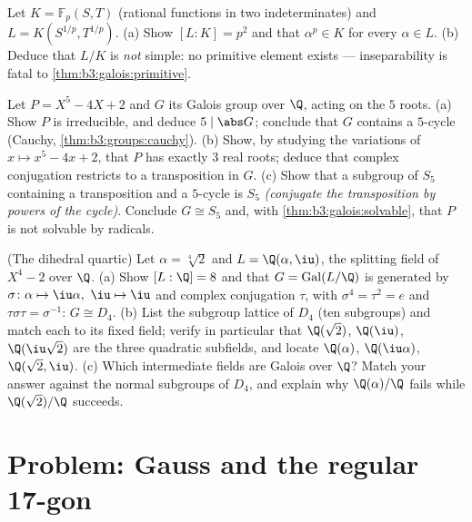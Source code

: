 \begin{exercise}[$\star\star\star$]\label{exo:b3:galois:10}
Let $K = \mathbb F_p(S, T)$ (rational functions in two
indeterminates) and $L = K(S^{1/p}, T^{1/p})$.
(a) Show $[L:K] = p^2$ and that $\alpha^p \in K$ for every
$\alpha \in L$.
(b) Deduce that $L/K$ is \emph{not} simple: no primitive element
exists --- inseparability is fatal to
\cref{thm:b3:galois:primitive}.
\end{exercise}

\begin{exercise}[$\star\star\star$]\label{exo:b3:galois:11}
Let $P = X^5 - 4X + 2$ and $G$ its Galois group over $\Q$,
acting on the $5$ roots.
(a) Show $P$ is irreducible, and deduce $5 \mid \abs G$; conclude
that $G$ contains a $5$-cycle (Cauchy,
\cref{thm:b3:groups:cauchy}).
(b) Show, by studying the variations of $x \mapsto x^5 - 4x +
2$, that $P$ has exactly $3$ real roots; deduce that complex
conjugation restricts to a transposition in $G$.
(c) Show that a subgroup of $S_5$ containing a transposition and
a $5$-cycle is $S_5$ \emph{(conjugate the transposition by
powers of the cycle)}. Conclude $G \cong S_5$ and, with
\cref{thm:b3:galois:solvable}, that $P$ is not solvable by
radicals.
\end{exercise}

\begin{exercise}[$\star\star\star$]\label{exo:b3:galois:12}
(The dihedral quartic) Let $\alpha = \sqrt[4]2$ and $L =
\Q(\alpha, \iu)$, the splitting field of $X^4 - 2$ over $\Q$.
(a) Show $[L : \Q] = 8$ and that $G =
\operatorname{Gal}(L/\Q)$ is generated by $\sigma\colon
\alpha \mapsto \iu\alpha,\ \iu \mapsto \iu$ and complex
conjugation $\tau$, with $\sigma^4 = \tau^2 = e$ and
$\tau\sigma\tau = \sigma^{-1}$: $G \cong D_4$.
(b) List the subgroup lattice of $D_4$ (ten subgroups) and
match each to its fixed field; verify in particular that
$\Q(\sqrt2)$, $\Q(\iu)$, $\Q(\iu\sqrt2)$ are the three
quadratic subfields, and locate $\Q(\alpha)$,
$\Q(\iu\alpha)$, $\Q(\sqrt2, \iu)$.
(c) Which intermediate fields are Galois over $\Q$? Match
your answer against the normal subgroups of $D_4$, and
explain why $\Q(\alpha)/\Q$ fails while $\Q(\sqrt2)/\Q$
succeeds.
\end{exercise}

\section{Problem: Gauss and the regular 17-gon}

